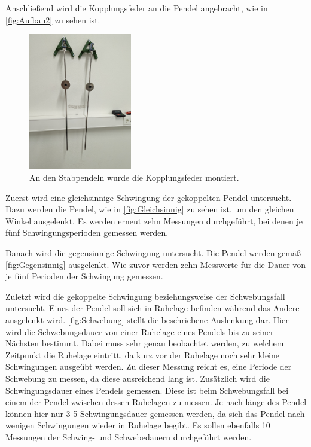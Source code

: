 Anschließend wird die Kopplungsfeder an die Pendel angebracht, wie in \autoref{fig:Aufbau2} zu sehen ist. 
\begin{figure}
    \centering
    \includegraphics[width=0.4\textwidth]{content/Gekoppelt.jpg}
	\caption{An den Stabpendeln wurde die Kopplungsfeder montiert.}
	\label{fig:Aufbau2}
\end{figure}
Zuerst wird eine gleichsinnige Schwingung der gekoppelten Pendel untersucht. Dazu werden die Pendel, wie in \autoref{fig:Gleichsinnig} zu sehen ist, um den gleichen Winkel ausgelenkt.
Es werden erneut zehn Messungen durchgeführt, bei denen je fünf Schwingungsperioden gemessen werden.

Danach wird die gegensinnige Schwingung untersucht. Die Pendel werden gemäß \autoref{fig:Gegensinnig} ausgelenkt. Wie zuvor werden zehn Messwerte für die Dauer von je fünf Perioden der
Schwingung gemessen.


Zuletzt wird die gekoppelte Schwingung beziehungsweise der Schwebungsfall untersucht. Eines der Pendel soll sich in Ruhelage befinden während das Andere ausgelenkt wird. 
\autoref{fig:Schwebung} stellt die beschriebene Auslenkung dar. Hier wird die Schwebungsdauer von einer Ruhelage eines Pendels bis zu seiner Nächsten bestimmt. Dabei muss sehr
genau beobachtet werden, zu welchem Zeitpunkt die Ruhelage eintritt, da kurz vor der Ruhelage noch sehr kleine Schwingungen ausgeübt werden. Zu dieser Messung reicht es, eine Periode der Schwebung
zu messen, da diese ausreichend lang ist. Zusätzlich wird die Schwingungsdauer eines Pendels gemessen. Diese ist beim Schwebungsfall bei einem der Pendel zwischen dessen Ruhelagen zu messen. Je nach länge 
des Pendel können hier nur 3-5 Schwingungsdauer gemessen werden, da sich das Pendel nach wenigen Schwingungen wieder in Ruhelage begibt. Es sollen ebenfalls 10 Messungen der Schwing- und Schwebedauern
durchgeführt werden. 